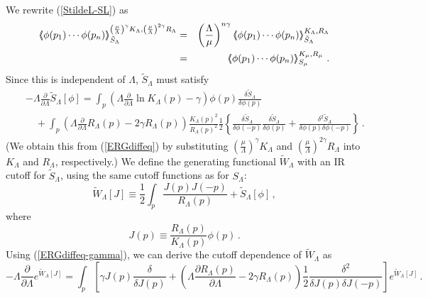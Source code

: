 \documentclass[aps,prd,preprint,groupedaddress,preprintnumbers,longbibliography]{revtex4-1}
\newcommand{\nn}{\nonumber}
\newcommand{\lb}{\left\lbrace}
\newcommand{\rb}{\right\rbrace}
\newcommand{\SL}{S_\Lambda}
\newcommand{\vev}[1]{\left\langle #1 \right\rangle}
\newcommand{\vvev}[1]{\vev{\kern-0.3em\left\langle #1
    \right\rangle\kern-0.3em}}
\begin{document}
We rewrite (\ref{StildeL-SL}) as
\begin{eqnarray}
\vvev{\phi (p_1) \cdots \phi
  (p_n)}_{\tilde{S}_\Lambda}^{\left(\frac{\mu}{\Lambda}\right)^\gamma
  K_\Lambda, \left(\frac{\mu}{\Lambda}\right)^{2\gamma} R_\Lambda}
&=& \left(\frac{\Lambda}{\mu}\right)^{n\gamma} \vvev{\phi (p_1) \cdots
  \phi (p_n)}_{\tilde{S}_\Lambda}^{K_\Lambda, R_\Lambda}\nn\\
&=& \vvev{\phi (p_1) \cdots \phi (p_n)}_{S_\mu}^{K_\mu, R_\mu}\,.
\end{eqnarray}
Since this is independent of $\Lambda$, $\tilde{S}_\Lambda$ must
satisfy
\begin{eqnarray}
&&- \Lambda \frac{\partial}{\partial \Lambda} \tilde{S}_\Lambda [\phi]
= \int_p \left( \Lambda \frac{\partial}{\partial \Lambda} \ln
  K_\Lambda (p) - \gamma \right) \phi (p) \frac{\delta
  \tilde{S}_\Lambda}{\delta \phi (p)}\nn\\
&&\quad + \int_p \left( \Lambda \frac{\partial}{\partial \Lambda} R_\Lambda
  (p) - 2 \gamma R_\Lambda (p)\right) \frac{K_\Lambda (p)^2}{R_\Lambda
  (p)^2} \frac{1}{2} \lb \frac{\delta \tilde{S}_\Lambda}{\delta \phi
  (-p)} \frac{\delta \tilde{S}_\Lambda}{\delta \phi (p)}
+ \frac{\delta^2 \tilde{S}_\Lambda}{\delta \phi (p)\delta \phi (-p)}
\rb\,.\label{ERGdiffeq-gamma}
\end{eqnarray}
(We obtain this from (\ref{ERGdiffeq}) by substituting
$\left(\frac{\mu}{\Lambda}\right)^\gamma K_\Lambda$ and
$\left(\frac{\mu}{\Lambda}\right)^{2\gamma} R_\Lambda$ into
$K_\Lambda$ and $R_\Lambda$, respectively.)  We define the generating
functional $\tilde{W}_\Lambda$ with an IR cutoff for
$\tilde{S}_\Lambda$, using the same cutoff functions as for $\SL$:
\begin{equation}
\tilde{W}_\Lambda [J] \equiv \frac{1}{2} \int_p \frac{J(p)
  J(-p)}{R_\Lambda (p)} + \tilde{S}_\Lambda [\phi]\,,
\end{equation}
where
\begin{equation}
J(p) \equiv \frac{R_\Lambda (p)}{K_\Lambda (p)} \phi (p)\,.
\end{equation}
Using (\ref{ERGdiffeq-gamma}), we can derive the cutoff dependence of
$\tilde{W}_\Lambda$ as
\begin{equation}
- \Lambda \frac{\partial}{\partial \Lambda} e^{\tilde{W}_\Lambda [J]}
= \int_p \left[ \gamma J(p) \frac{\delta}{\delta J(p)} + \left(
    \Lambda \frac{\partial R_\Lambda (p)}{\partial \Lambda} - 2 \gamma
    R_\Lambda (p) \right) \frac{1}{2} \frac{\delta^2}{\delta J(p)
    \delta J(-p)} \right] e^{\tilde{W}_\Lambda [J]}\,.\label{diffusion-gamma} 
\end{equation}
\end{document}
